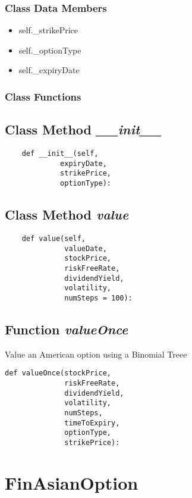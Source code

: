 \documentclass[twoside,11pt]{book}
\begin{document}
\subsubsection{Class Data Members}
\begin{itemize}
\item{self.\_strikePrice}
\item{self.\_optionType}
\item{self.\_expiryDate}
\end{itemize}

\subsubsection{Class Functions}

\subsection{Class Method {\it \_\_init\_\_}}


\begin{lstlisting}
    def __init__(self,
             expiryDate,
             strikePrice,
             optionType):
\end{lstlisting}

\subsection{Class Method {\it value}}


\begin{lstlisting}
    def value(self,
              valueDate,
              stockPrice,
              riskFreeRate,
              dividendYield,
              volatility,
              numSteps = 100):
\end{lstlisting}

\subsection{Function {\it valueOnce}}
Value an American option using a Binomial Treee 

\begin{lstlisting}
def valueOnce(stockPrice,
              riskFreeRate,
              dividendYield,
              volatility,
              numSteps,
              timeToExpiry,
              optionType,
              strikePrice):
\end{lstlisting}

\newpage
\section{FinAsianOption}
\end{document}
